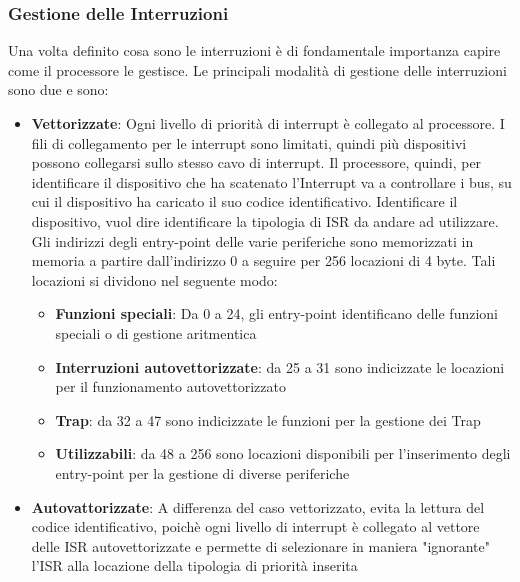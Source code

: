 \subsubsection{Gestione delle Interruzioni}
Una volta definito cosa sono le interruzioni è di fondamentale importanza capire come il processore le gestisce. Le principali modalità di gestione delle interruzioni sono due e sono:
\begin{itemize}
    \item \textbf{Vettorizzate}: Ogni livello di priorità di interrupt è collegato al processore. I fili di collegamento per le interrupt sono limitati, quindi più dispositivi possono collegarsi sullo stesso cavo di interrupt. Il processore, quindi, per identificare il dispositivo che ha scatenato l'Interrupt va a controllare i bus, su cui il dispositivo ha caricato il suo codice identificativo. Identificare il dispositivo, vuol dire identificare la tipologia di ISR da andare ad utilizzare. Gli indirizzi degli entry-point delle varie periferiche sono memorizzati in memoria a partire dall'indirizzo 0 a seguire per 256 locazioni di 4 byte. Tali locazioni si dividono nel seguente modo:
    \begin{itemize}
        \item \textbf{Funzioni speciali}: Da 0 a 24, gli entry-point identificano delle funzioni speciali o di gestione aritmentica
        \item \textbf{Interruzioni autovettorizzate}: da 25 a 31 sono indicizzate le locazioni per il funzionamento autovettorizzato
        \item \textbf{Trap}: da 32 a 47 sono indicizzate le funzioni per la gestione dei Trap
        \item \textbf{Utilizzabili}: da 48 a 256 sono locazioni disponibili per l'inserimento degli entry-point per la gestione di diverse periferiche
    \end{itemize}
    \item \textbf{Autovattorizzate}: A differenza del caso vettorizzato, evita la lettura del codice identificativo, poichè ogni livello di interrupt è collegato al vettore delle ISR autovettorizzate e permette di selezionare in maniera "ignorante" l'ISR alla locazione della tipologia di priorità inserita
\end{itemize}

